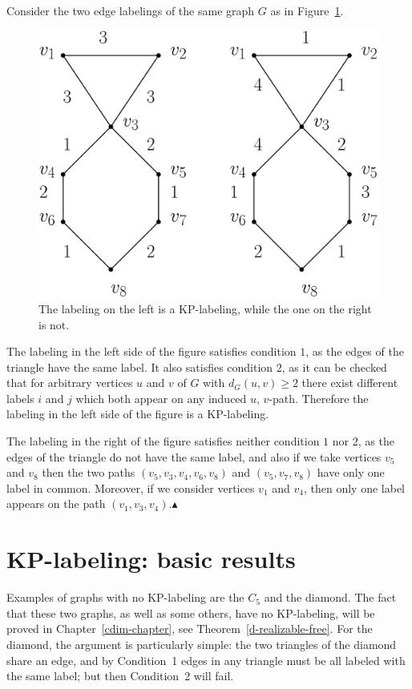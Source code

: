 \documentclass[12pt,a4paper,titlepage,openany]{report}
\begin{document}
\medskip
\begin{example}
Consider the two edge labelings of the same graph $G$ as in Figure~\ref{kpexample}.

\begin{figure}[h!]
\begin{center}
\includegraphics[width=0.65\linewidth]{figures/kpexample.png}
\end{center}
\caption{The labeling on the left is a KP-labeling, while the one on the right is not.}\label{kpexample}
\end{figure}

The labeling in the left side of the figure satisfies condition $1$, as the edges of the triangle have the same label. It also satisfies condition $2$, as it can be checked that for arbitrary vertices $u$ and $v$ of $G$ with $d_G(u,v) \geq 2$ there exist different labels $i$ and $j$ which both appear on any induced $u$, $v$-path. Therefore the labeling in the left side of the figure is a KP-labeling.

The labeling in the right of the figure satisfies neither condition $1$ nor $2$, as the edges of the triangle do not have the same label, and also if we take vertices $v_5$ and $v_8$ then the two paths $(v_5,v_3,v_4,v_6,v_8)$ and $(v_5,v_7,v_8)$ have only one label in common.
Moreover, if we consider vertices $v_1$ and $v_4$, then only one label appears on the path $(v_1,v_3,v_4)$.\hfill$\blacktriangle$
\end{example}

\section{KP-labeling: basic results}

Examples of graphs with no KP-labeling are the $C_5$ and the diamond.
The fact that these two graphs, as well as some others,
have no KP-labeling, will be proved in Chapter~\ref{cdim-chapter}, see Theorem~\ref{d-realizable-free}.
For the diamond, the argument is particularly simple: the two triangles of the diamond share an edge,
and by Condition~1 edges in any triangle must be all labeled with the same label; but then Condition~2 will fail.
\end{document}
